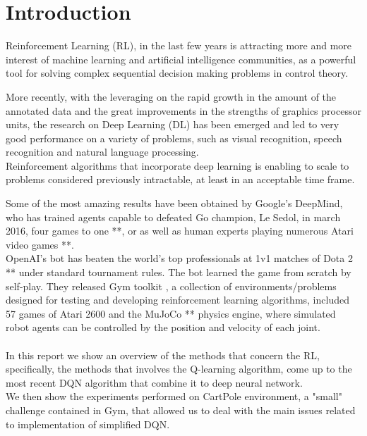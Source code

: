 \section{Introduction}

\noindent 
Reinforcement Learning (RL), in the last few years is attracting more and more interest of machine learning and artificial intelligence communities, as a powerful tool for solving complex sequential decision making problems in control theory.

More recently, with the leveraging on the rapid growth in the amount of the annotated data and the great improvements in the strengths of graphics processor units, the research on  Deep Learning (DL) has been emerged and led to very good performance on a variety of problems, such as visual recognition, speech recognition and natural language processing.
\\Reinforcement algorithms that incorporate deep learning is enabling to scale to problems considered previously intractable, at least in an acceptable time frame.

Some of the most amazing results have been obtained by Google’s DeepMind, who has trained agents capable to defeated Go champion, Le Sedol, in march 2016, four games to one **, or as well as human experts playing numerous Atari video games **.
\\OpenAI's bot has beaten the world's top professionals at 1v1 matches of Dota 2 ** under standard tournament rules. The bot learned the game from scratch by self-play.
They released Gym toolkit \cite{Gym}, a collection of environments/problems designed for testing and developing reinforcement learning algorithms, included 57 games of Atari 2600 and the MuJoCo ** physics engine, where simulated robot agents can be controlled by the position and velocity of each joint. 
\\\\
In this report we show an overview of the methods that concern the RL, specifically, the methods that involves the Q-learning algorithm, come up to the most recent DQN algorithm that combine it to deep neural network.
\\We then show the experiments performed on CartPole environment, a "small" challenge contained in Gym, that allowed us to deal with the main issues related to implementation of simplified DQN.
